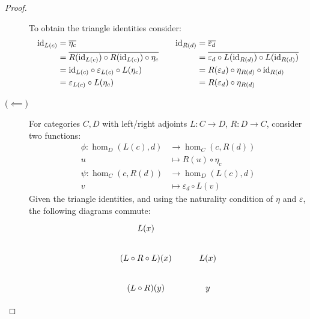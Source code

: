 \begin{theorem}
\begin{proof}
\begin{description}
        To obtain the triangle identities consider:
        \[
          \begin{aligned}
            \mathrm{id}_{L(c)} &= \overline{\eta_c}\\
              &= \overline{R(\mathrm{id}_{L(c)})\circ R(\mathrm{id}_{L(c)})\circ \eta_c}\\
              &= \mathrm{id}_{L(c)} \circ \varepsilon_{L(c)}\circ L(\eta_c)\\
              &= \varepsilon_{L(c)}\circ L(\eta_c)
          \end{aligned}
          \qquad
          \begin{aligned}
            \mathrm{id}_{R(d)} &= \overline{\varepsilon_d}\\
              &= \overline{\varepsilon_d
                \circ L(\mathrm{id}_{R(d)})\circ L(\mathrm{id}_{R(d)})}\\
              &= R(\varepsilon_d) \circ \eta_{R(d)} \circ \mathrm{id}_{R(d)}\\
              &= R(\varepsilon_d) \circ \eta_{R(d)}
          \end{aligned}
        \]
      \item[($\impliedby$)] For categories $C,D$ with left/right adjoints
        $L:C\to D$, $R:D\to C$, consider two functions:
        \[
          \begin{aligned}
            \phi: \hom_D(L(c), d) &\to \hom_C(c, R(d))\\
            u &\mapsto R(u)\circ \eta_c\\
            \psi: \hom_C(c, R(d)) &\to \hom_D(L(c), d)\\
            v &\mapsto \varepsilon_d \circ L(v)
          \end{aligned}
        \]
        Given the triangle identities, and using the naturality condition of $\eta$ and $\varepsilon$, the following diagrams commute:
        \[\begin{tikzcd}[ampersand replacement=\&]
          {L(x)} \\
          {(L\circ R\circ L)(x)} \& {L(x)} \\
          {(L\circ R)(y)} \& y

\end{tikzcd}\]
\end{description}
\end{proof}
\end{theorem}
